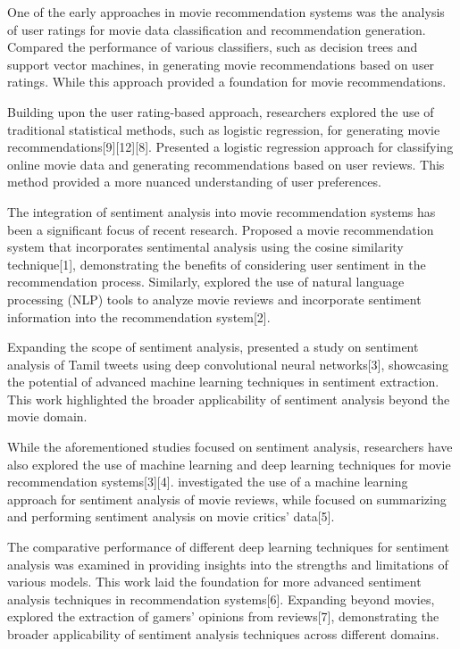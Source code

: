 \documentclass[acmlarge,nonacm,12pt]{acmart}
\begin{document}
One of the early approaches in movie recommendation systems was the analysis of user ratings for movie data classification and recommendation generation. Compared the performance of various classifiers, such as decision trees and support vector machines, in generating movie recommendations based on user ratings. While this approach provided a foundation for movie recommendations. 

Building upon the user rating-based approach, researchers explored the use of traditional statistical methods, such as logistic regression, for generating movie recommendations[9][12][8]. Presented a logistic regression approach for classifying online movie data and generating recommendations based on user reviews. This method provided a more nuanced understanding of user preferences.

The integration of sentiment analysis into movie recommendation systems has been a significant focus of recent research. Proposed a movie recommendation system that incorporates sentimental analysis using the cosine similarity technique[1], demonstrating the benefits of considering user sentiment in the recommendation process. Similarly, explored the use of natural language processing (NLP) tools to analyze movie reviews and incorporate sentiment information into the recommendation system[2].

Expanding the scope of sentiment analysis, presented a study on sentiment analysis of Tamil tweets using deep convolutional neural networks[3], showcasing the potential of advanced machine learning techniques in sentiment extraction. This work highlighted the broader applicability of sentiment analysis beyond the movie domain.

While the aforementioned studies focused on sentiment analysis, researchers have also explored the use of machine learning and deep learning techniques for movie recommendation systems[3][4]. investigated the use of a machine learning approach for sentiment analysis of movie reviews, while focused on summarizing and performing sentiment analysis on movie critics’ data[5].

The comparative performance of different deep learning techniques for sentiment analysis was examined in providing insights into the strengths and limitations of various models. This work laid the foundation for more advanced sentiment analysis techniques in recommendation systems[6]. Expanding beyond movies, explored the extraction of gamers’ opinions from reviews[7], demonstrating the broader applicability of sentiment analysis techniques across different domains.
\end{document}

